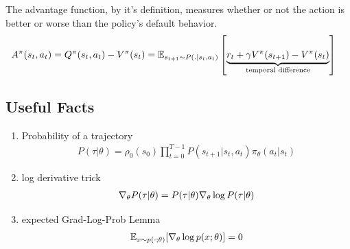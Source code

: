 \begin{definition}[Advantage]
The advantage function, by it’s definition, measures whether or not the action is better or worse than the policy’s default behavior.
    \begin{align}
        A^{\pi}(s_t, a_t) 
        & =  Q^{\pi}(s_t, a_t) - V^{\pi}(s_t)  = \mathbb{E}_{s_{t+1}\sim P(.|s_t, a_t)} \left[\underbrace{r_t + \gamma V^{\pi}(s_{t+1}) -  V^{\pi}(s_t)}_{\text{temporal difference}}\right]
    \end{align}
    
\end{definition}

\subsection{Useful Facts}

\begin{enumerate}
    \item  Probability of a trajectory 
        \begin{align}
        P(\tau | \theta)=\rho_0\left(s_0\right) \prod_{t=0}^{T-1} P\left(s_{t+1} | s_t, a_t\right) \pi_\theta\left(a_t | s_t\right) \label{eq:prob.of.a.trajectory}
        \end{align}
     \item  log derivative trick
         \begin{align}
        \nabla_{\theta} P(\tau | \theta)=  P(\tau | \theta) \nabla_\theta \log P(\tau | \theta)\label{eq:log.derivative.trick}
        \end{align}
    \item expected Grad-Log-Prob Lemma
        \begin{align}\label{eq:grad.log.prob}
            \mathbb{E}_{x\sim p(\cdot;\theta)} [\nabla_{\theta} \log p(x;\theta)] = 0
        \end{align}

    
\end{enumerate}


